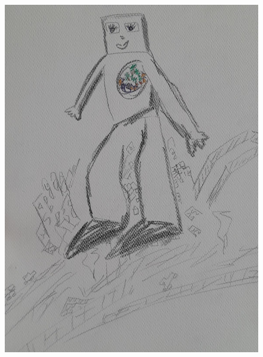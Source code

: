 \documentclass[12pt, a4paper, twoside]{book} %
\begin{document}
\begin{figure}[H]
	\centering
	\includegraphics[width=\textwidth]{./images/1f81324df12268.jpg}
\end{figure}

\clearpage
\end{document}
